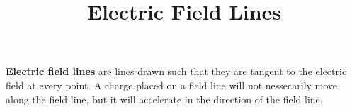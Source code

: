 \documentclass{article}
\title{Electric Field Lines}
\begin{document}
\maketitle

\begin{definition}
\textbf{Electric field lines} are lines drawn such that they are tangent to the electric field at every point. A charge placed on a field line will not nessecarily move along the field line, but it will accelerate in the direction of the field line.   
\end{definition}
\end{document}
